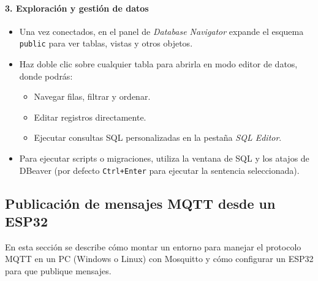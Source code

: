 \documentclass[12pt, a4paper]{article}
\begin{document}
\begin{umaappendices}
	\paragraph{3. Exploración y gestión de datos}  
	\begin{itemize}
		\item Una vez conectados, en el panel de \emph{Database Navigator} expande el esquema \texttt{public} para ver tablas, vistas y otros objetos.
		\item Haz doble clic sobre cualquier tabla para abrirla en modo editor de datos, donde podrás:
		\begin{itemize}
			\item Navegar filas, filtrar y ordenar.
			\item Editar registros directamente.
			\item Ejecutar consultas SQL personalizadas en la pestaña \emph{SQL Editor}.
	\end{itemize}
		\item Para ejecutar scripts o migraciones, utiliza la ventana de SQL y los atajos de DBeaver (por defecto \texttt{Ctrl+Enter} para ejecutar la sentencia seleccionada).
	\end{itemize}

	\subsection{Publicación de mensajes MQTT desde un ESP32}
		\label{sec:pub_mqtt_esp32}
		
		En esta sección se describe cómo montar un entorno para manejar el protocolo MQTT en un PC (Windows o Linux) con Mosquitto y cómo configurar un ESP32 para que publique mensajes.
		

\end{umaappendices}
\end{document}
